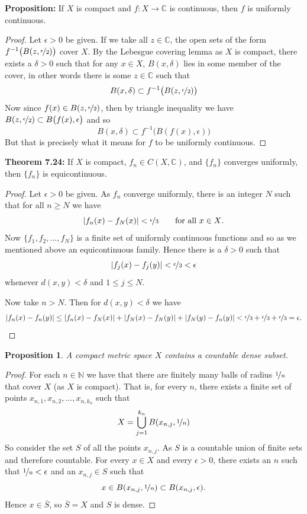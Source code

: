 \documentclass[12pt]{book}
\newcommand{\abs}[1]{\left\lvert {#1} \right\rvert}
\newcommand{\C}{{\mathbb{C}}}
\newcommand{\N}{{\mathbb{N}}}
\theoremstyle{plain}
\newtheorem{prop}[thm]{Proposition}
\theoremstyle{remark}
\theoremstyle{definition}
\theoremstyle{exercise}
\theoremstyle{example}
\begin{document}
\textbf{Proposition:}
If $X$ is compact and $f \colon X \to \C$ is continuous, then
$f$ is uniformly continuous.

\medskip

\begin{proof}
Let $\epsilon > 0$ be given.
If we take all $z \in \C$,
the open sets of the form $f^{-1}\bigl(B(z,\nicefrac{\epsilon}{2})\bigr)$
cover $X$.
By the Lebesgue covering lemma as $X$ is compact,
there exists a $\delta > 0$
such that for any $x \in X$, $B(x,\delta)$ lies in some member of the cover,
in other words there is some $z \in \C$ such that
$$
B(x,\delta) \subset f^{-1}\bigl(B(z,\nicefrac{\epsilon}{2})\bigr)
$$
Now since $f(x) \in B(z,\nicefrac{\epsilon}{2})$,
then by triangle inequality we have
$B(z,\nicefrac{\epsilon}{2}) \subset B\bigl(f(x),\epsilon\bigr)$ and so
$$
B(x,\delta) \subset f^{-1}\bigl(B(f(x),\epsilon)\bigr)
$$
But that is precisely what it means for $f$ to be uniformly continuous.
\end{proof}

\medskip

\textbf{Theorem 7.24:}
If $X$ is compact, $f_n \in C(X,\C)$, and $\{ f_n \}$
converges uniformly, then $\{ f_n \}$ is equicontinuous.

\medskip

\begin{proof}
Let $\epsilon > 0$ be given.
As $f_n$ converge uniformly, there is an integer $N$ such that for
all $n \geq N$ we have
$$
\abs{f_n(x)-f_N(x)} < \nicefrac{\epsilon}{3} \qquad \text{for all $x \in X$}.
$$
Now $\{ f_1,f_2,\ldots,f_N \}$ is a finite set of uniformly continuous
functions and so as we mentioned above an equicontinuous family.  Hence
there is a $\delta > 0$ such that
$$
\abs{f_j(x)-f_j(y)} < \nicefrac{\epsilon}{3} < \epsilon
$$
whenever $d(x,y) < \delta$ and $1 \leq j \leq N$.

Now take $n > N$.  Then for $d(x,y) < \delta$ we have
\begin{equation*}
\abs{f_n(x)-f_n(y)}
\leq
\abs{f_n(x)-f_N(x)}
+
\abs{f_N(x)-f_N(y)}
+
\abs{f_N(y)-f_n(y)}
<
\nicefrac{\epsilon}{3}
+
\nicefrac{\epsilon}{3}
+
\nicefrac{\epsilon}{3}
=\epsilon .
\end{equation*}
\end{proof}

\begin{prop}
A compact metric space $X$ contains a countable dense subset.
\end{prop}

\begin{proof}
For each $n \in \N$ we have that there are finitely many
balls of radius $\nicefrac{1}{n}$ that cover $X$ (as $X$ is compact). That is,
for every $n$, there exists
a finite set of points $x_{n,1},x_{n,2},\ldots,x_{n,k_n}$ such that
$$
X= \bigcup_{j=1}^{k_n} B(x_{n,j},\nicefrac{1}{n})
$$
So consider the set $S$ of all the points $x_{n,j}$.  As $S$ is a countable
union of finite sets and therefore countable.  For every $x \in X$
and every $\epsilon > 0$, there exists an $n$ such that
$\nicefrac{1}{n} < \epsilon$ and an $x_{n,j} \in S$ such that
$$
x \in B(x_{n,j},\nicefrac{1}{n}) \subset B(x_{n,j},\epsilon) .
$$
Hence $x \in \overline{S}$, so $\overline{S} = X$ and $S$ is dense.
\end{proof}
\end{document}
